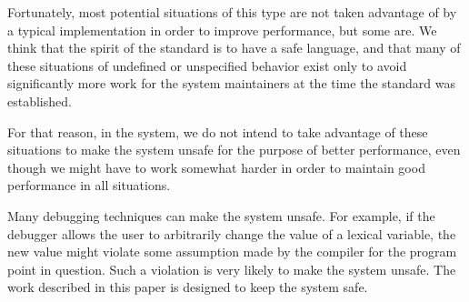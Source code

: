 Fortunately, most potential situations of this type are not taken
advantage of by a typical \commonlisp{} implementation in order to
improve performance, but some are.  We think that the spirit of the
\commonlisp{} standard is to have a safe language, and that many of
these situations of undefined or unspecified behavior exist only to
avoid significantly more work for the system maintainers at the time
the standard was established.

For that reason, in the \sicl{} system, we do not intend to take
advantage of these situations to make the system unsafe for the
purpose of better performance, even though we might have to work
somewhat harder in order to maintain good performance in all
situations.

Many debugging techniques can make the system unsafe.  For example, if
the debugger allows the user to arbitrarily change the value of a
lexical variable, the new value might violate some assumption made by
the compiler for the program point in question.  Such a violation is
very likely to make the system unsafe.  The work described in this
paper is designed to keep the system safe.
